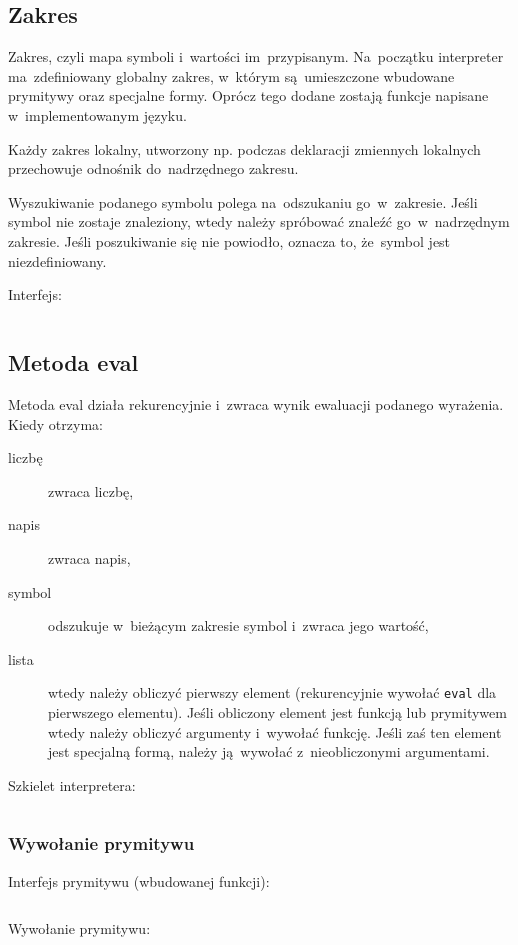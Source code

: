 \documentclass[a4paper,11pt]{article}
\newcommand{\impl}[1]{\inputminted[fontsize=\footnotesize]{java}{impl/#1.java}}
\begin{document}
\subsection{Zakres}

Zakres, czyli mapa symboli i~wartości im~przypisanym. Na~początku interpreter
ma~zdefiniowany globalny zakres, w~którym są~umieszczone wbudowane prymitywy
oraz specjalne formy. Oprócz tego dodane zostają funkcje napisane
w~implementowanym języku.

Każdy zakres lokalny, utworzony np. podczas deklaracji zmiennych lokalnych
przechowuje odnośnik do~nadrzędnego zakresu.

Wyszukiwanie podanego symbolu polega na~odszukaniu go~w~zakresie. Jeśli symbol
nie zostaje znaleziony, wtedy należy spróbować znaleźć go~w~nadrzędnym
zakresie. Jeśli poszukiwanie się nie powiodło, oznacza to, że~symbol jest
niezdefiniowany.

Interfejs:
\impl{Scope}

\subsection{Metoda eval}

Metoda eval działa rekurencyjnie i~zwraca wynik ewaluacji podanego wyrażenia.
Kiedy otrzyma:
\begin{description}
\item[liczbę] zwraca liczbę,
\item[napis] zwraca napis,
\item[symbol] odszukuje w~bieżącym zakresie symbol i~zwraca jego wartość,
\item[lista] wtedy należy obliczyć pierwszy element (rekurencyjnie wywołać
  \verb+eval+ dla pierwszego elementu). Jeśli obliczony element jest funkcją
  lub prymitywem wtedy należy obliczyć argumenty i~wywołać funkcję. Jeśli zaś
  ten element jest specjalną formą, należy ją~wywołać z~nieobliczonymi
  argumentami.
\end{description}

Szkielet interpretera:
\impl{Interpreter}

\subsubsection{Wywołanie prymitywu}

Interfejs prymitywu (wbudowanej funkcji):
\impl{Primitive}

Wywołanie prymitywu:
\impl{evalPrimitive}
\end{document}
